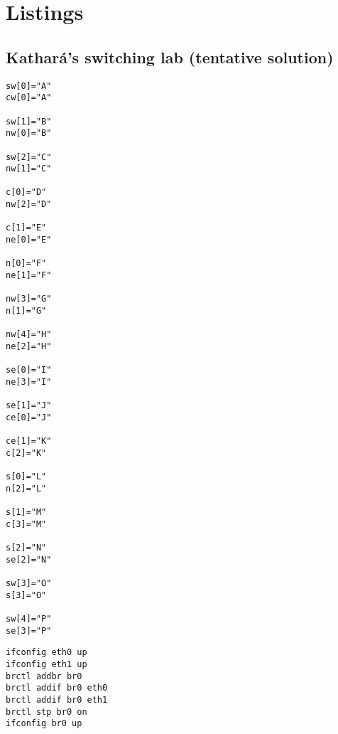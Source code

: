 \chapter{Listings}
\label{ch:listings}

\section{Kathará's switching lab (tentative solution)}

\begin{lstlisting}[frame=single,caption=Lab 2's topology configuration,captionpos=b,label=lab2conf]
sw[0]="A"
cw[0]="A"

sw[1]="B"
nw[0]="B"

sw[2]="C"
nw[1]="C"

c[0]="D"
nw[2]="D"

c[1]="E"
ne[0]="E"

n[0]="F"
ne[1]="F"

nw[3]="G"
n[1]="G"

nw[4]="H"
ne[2]="H"

se[0]="I"
ne[3]="I"

se[1]="J"
ce[0]="J"

ce[1]="K"
c[2]="K"

s[0]="L"
n[2]="L"

s[1]="M"
c[3]="M"

s[2]="N"
se[2]="N"

sw[3]="O"
s[3]="O"

sw[4]="P"
se[3]="P"
\end{lstlisting}

\begin{lstlisting}[frame=single,caption=Example node startup configuration,captionpos=b,label=lab2conf]
ifconfig eth0 up
ifconfig eth1 up
brctl addbr br0
brctl addif br0 eth0
brctl addif br0 eth1
brctl stp br0 on
ifconfig br0 up
\end{lstlisting}

